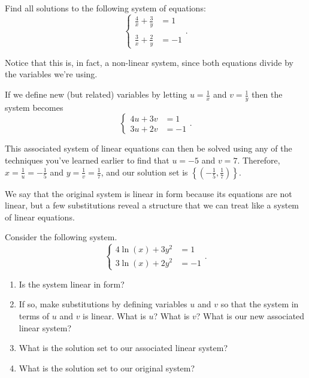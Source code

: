 \documentclass[nooutcomes]{ximera}
\begin{document}
\begin{example}
Find all solutions to the following system of equations:
$$
\begin{cases}
\frac{4}{x} + \frac{3}{y} & =  1 \\
& \\
\frac{3}{x} + \frac{2}{y} & =  -1
\end{cases}.
$$
\end{example}
\begin{explanation}
Notice that this is, in fact, a non-linear system, since both equations divide by the variables we're using.

If we define new (but related) variables by letting $u = \frac{1}{x}$ and $v = \frac{1}{y}$ then the system becomes 
$$
\begin{cases}
4u + 3v & =  1 \\
3u + 2v & =  -1
\end{cases}.
$$

This associated system of linear equations can then be solved using any of the techniques you've learned earlier to find that $u = -5$ and $v = 7$. Therefore, $x = \frac{1}{u} = -\frac{1}{5}$ and $y = \frac{1}{v} = \frac{1}{7}$, and our solution set is $\left\{\left(-\frac{1}{5}, \frac{1}{7}\right)\right\}$.
\end{explanation}

We say that the original system is linear in form because its equations are not linear, but a few
substitutions reveal a structure that we can treat like a system of linear equations. 

\begin{exploration}
Consider the following system.
$$
\begin{cases}
4\ln(x) + 3y^2 & =  1 \\

3\ln(x) + 2y^2 & =  -1
\end{cases}.
$$
\begin{enumerate}
\item Is the system linear in form?
\item If so, make substitutions by defining variables $u$ and $v$ so that the system in terms of $u$ and $v$ is linear. What is $u$? What is $v$? What is our new associated linear system?
\item What is the solution set to our associated linear system?
\item What is the solution set to our original system?
\end{enumerate}
\end{exploration}
\end{document}
